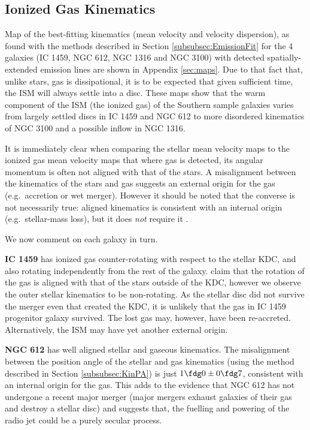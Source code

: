\documentclass[a4paper,fleqn,usenatbib]{mnras}
\begin{document}
	\subsection{Ionized Gas Kinematics}
		\label{subsec:GasKin}
		Map of the best-fitting kinematics (mean velocity and velocity dispersion), as found with the methods described in Section \ref{subsubsec:EmissionFit} for the 4 galaxies (IC 1459, NGC 612, NGC 1316 and NGC 3100) with detected spatially-extended emission lines are shown in Appendix \ref{sec:maps}. Due to that fact that, unlike stars, gas is dissipational, it is to be expected that given sufficient time, the ISM will always settle into a disc. These maps show that the warm component of the ISM (the ionized gas) of the Southern sample galaxies varies from largely settled discs in IC 1459 and NGC 612 to more disordered kinematics of NGC 3100 and a possible inflow in NGC 1316.

		It is immediately clear when comparing the stellar mean velocity maps to the ionized gas mean velocity maps that where gas is detected, its angular momentum is often not aligned with that of the stars. A misalignment between the kinematics of the stars and gas suggests an external origin for the gas (e.g.\ accretion or wet merger). However it should be noted that the converse is not necessarily true: aligned kinematics is consistent with an internal origin (e.g.\ stellar-mass loss), but it does \emph{not} require it \citep[e.g.][]{Davis2011a}. 

		We now comment on each galaxy in turn.

		\textbf{IC 1459} has ionized gas counter-rotating with respect to the stellar KDC, and also rotating independently from the rest of the galaxy. \citet{Franx1988} claim that the rotation of the gas is aligned with that of the stars outside of the KDC, however we observe the outer stellar kinematics to be non-rotating. As the stellar disc did not survive the merger even that created the KDC, it is unlikely that the gas in IC 1459 progenitor galaxy survived. The lost gas may, however, have been re-accreted. Alternatively, the ISM may have yet another external origin. 

		\textbf{NGC 612} has well aligned stellar and gaseous kinematics. The misalignment between the position angle of the stellar and gas kinematics (using the method described in Section \ref{subsubsec:KinPA}) is just $1\fdg0\pm0\fdg7$, consistent with an internal origin for the gas. This adds to the evidence that NGC 612 has not undergone a recent major merger (major mergers exhaust galaxies of their gas and destroy a stellar disc) and suggests that, the fuelling and powering of the radio jet could be a purely secular process. 
\end{document}
